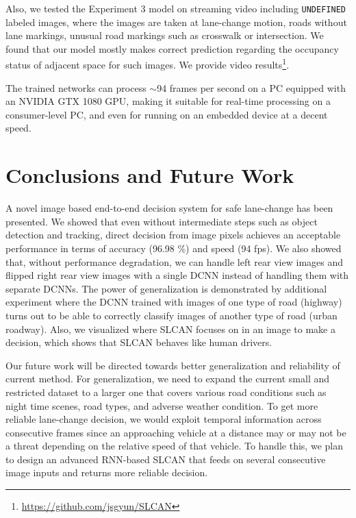 \documentclass[letterpaper, 10pt, conference]{ieeeconf}
\begin{document}
	Also, we tested the Experiment 3 model on streaming video including \texttt{UNDEFINED} labeled images, 
where the images are taken at lane-change motion, roads without lane markings, 
unusual road markings such as crosswalk or intersection. We found that our model 
mostly makes correct prediction regarding the occupancy status of adjacent space 
for such images. We provide video results\footnote{\url{https://github.com/jsgyun/SLCAN}}.
    
	The trained networks can process $\sim$94 frames per second on a PC equipped with an NVIDIA GTX 1080 GPU, making it suitable for real-time 
processing on a consumer-level PC, and even for running on an embedded device at a decent speed.
	
\section{Conclusions and Future Work}
\label{sec:conclusions}
	A novel image based end-to-end decision system for safe lane-change has been 
presented. We showed that even without intermediate steps such as object detection 
and tracking, direct decision from image pixels achieves an acceptable performance 
in terms of accuracy (96.98 \%) and speed (94 fps). We also showed that, without
performance degradation, we can handle left rear view images and flipped right rear 
view images with a single DCNN instead of handling them with separate DCNNs. 
The power of generalization is demonstrated by additional experiment where the DCNN 
trained with images of one type of road (highway) turns out to be able to correctly 
classify images of another type of road (urban roadway). Also, we visualized where 
SLCAN focuses on in an image to make a decision, which shows that SLCAN behaves
like human drivers.

	Our future work will be directed towards better generalization and reliability
of current method. For generalization, we need to expand the current small and 
restricted dataset to a larger one that covers various road conditions such as 
night time scenes, road types, and adverse weather condition. To get more reliable 
lane-change decision, we would exploit temporal information across consecutive 
frames since an approaching vehicle at a distance may or may not be a threat 
depending on the relative speed of that vehicle. To handle this, we plan to design 
an advanced RNN-based SLCAN that feeds on several consecutive image inputs and returns 
more reliable decision.
\end{document}
